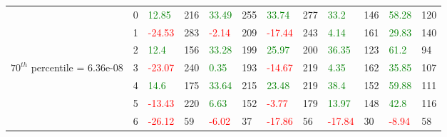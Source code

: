 \begin{table}[htb!]
\begin{adjustwidth}{-0.9in}{-0.9in}
\begin{tabular}{|p{5em}|p{2em}|p{3em}|p{3em}|p{3em}|p{3em}|p{3em}|p{3em}|p{3em}|p{3em}|p{3em}|p{3em}|}
            & 0 & \textcolor{green}{12.85} & 216 & \textcolor{green}{33.49} & 255 & \textcolor{green}{33.74} & 277 & \textcolor{green}{33.2} & 146 & \textcolor{green}{58.28} & 120\\\cline{3-12}
            & 1 & \textcolor{red}{-24.53} & 283 & \textcolor{red}{-2.14} & 209 & \textcolor{red}{-17.44} & 243 & \textcolor{green}{4.14} & 161 & \textcolor{green}{29.83} & 140\\\cline{3-12}
            & 2 & \textcolor{green}{12.4} & 156 & \textcolor{green}{33.28} & 199 & \textcolor{green}{25.97} & 200 & \textcolor{green}{36.35} & 123 & \textcolor{green}{61.2} & 94\\\cline{3-12}
            $70^{th}$ percentile = 6.36e-08 & 3 & \textcolor{red}{-23.07} & 240 & \textcolor{green}{0.35} & 193 & \textcolor{red}{-14.67} & 219 & \textcolor{green}{4.35} & 162 & \textcolor{green}{35.85} & 107\\[-5.5ex]\cline{3-12}
            & 4 & \textcolor{green}{14.6} & 175 & \textcolor{green}{33.64} & 215 & \textcolor{green}{23.48} & 219 & \textcolor{green}{38.4} & 152 & \textcolor{green}{59.88} & 111\\\cline{3-12}
            & 5 & \textcolor{red}{-13.43} & 220 & \textcolor{green}{6.63} & 152 & \textcolor{red}{-3.77} & 179 & \textcolor{green}{13.97} & 148 & \textcolor{green}{42.8} & 116\\\cline{3-12}
            & 6 & \textcolor{red}{-26.12} & 59 & \textcolor{red}{-6.02} & 37 & \textcolor{red}{-17.86} & 56 & \textcolor{red}{-17.84} & 30 & \textcolor{red}{-8.94} & 58\\\hline\hline


\end{tabular}
\end{adjustwidth}
\end{table}
